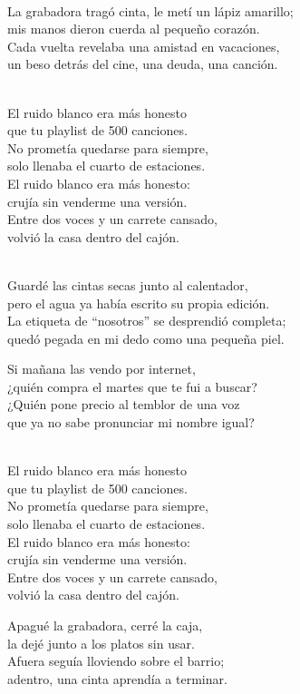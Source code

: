 \begin{lyrics}
\\
La grabadora tragó cinta, le metí un lápiz amarillo;\\
mis manos dieron cuerda al pequeño corazón.\\
Cada vuelta revelaba una amistad en vacaciones,\\
un beso detrás del cine, una deuda, una canción.

\\
El ruido blanco era más honesto\\
que tu playlist de 500 canciones.\\
No prometía quedarse para siempre,\\
solo llenaba el cuarto de estaciones.\\
El ruido blanco era más honesto:\\
crujía sin venderme una versión.\\
Entre dos voces y un carrete cansado,\\
volvió la casa dentro del cajón.

\\
Guardé las cintas secas junto al calentador,\\
pero el agua ya había escrito su propia edición.\\
La etiqueta de “nosotros” se desprendió completa;\\
quedó pegada en mi dedo como una pequeña piel.

Si mañana las vendo por internet,\\
¿quién compra el martes que te fui a buscar?\\
¿Quién pone precio al temblor de una voz\\
que ya no sabe pronunciar mi nombre igual?

\\
El ruido blanco era más honesto\\
que tu playlist de 500 canciones.\\
No prometía quedarse para siempre,\\
solo llenaba el cuarto de estaciones.\\
El ruido blanco era más honesto:\\
crujía sin venderme una versión.\\
Entre dos voces y un carrete cansado,\\
volvió la casa dentro del cajón.

Apagué la grabadora, cerré la caja,\\
la dejé junto a los platos sin usar.\\
Afuera seguía lloviendo sobre el barrio;\\
adentro, una cinta aprendía a terminar.

\end{lyrics}

